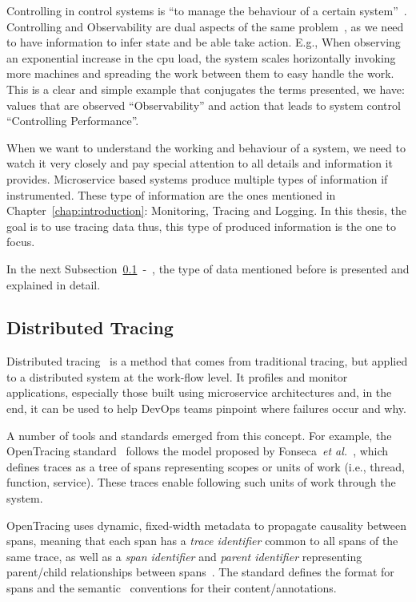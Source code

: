 Controlling in control systems is ``to manage the behaviour of a certain system''~\cite{control_systems}. Controlling and Observability are dual aspects of the same problem~\cite{observability}, as we need to have information to infer state and be able take action. E.g., When observing an exponential increase in the \gls{cpu} load, the system scales horizontally invoking more machines and spreading the work between them to easy handle the work. This is a clear and simple example that conjugates the terms presented, we have: values that are observed ``Observability'' and action that leads to system control ``Controlling Performance''.

When we want to understand the working and behaviour of a system, we need to watch it very closely and pay special attention to all details and information it provides. Microservice based systems produce multiple types of information if instrumented. These type of information are the ones mentioned in Chapter~\ref{chap:introduction}: Monitoring, Tracing and Logging. In this thesis, the goal is to use tracing data thus, this type of produced information is the one to focus.

In the next Subsection~\ref{subsec:distributed_tracing}~-~, the type of data mentioned before is presented and explained in detail.

\subsection{Distributed Tracing}
\label{subsec:distributed_tracing}


Distributed tracing~\cite{Sambasivan2016} is a method that comes from traditional tracing, but applied to a distributed system at the work-flow level. It profiles and monitor applications, especially those built using microservice architectures and, in the end, it can be used to help DevOps teams pinpoint where failures occur and why.

A number of tools and standards emerged from this concept. For example, the OpenTracing standard~\cite{open_tracing_data_model_specification} follows the model proposed by Fonseca~\textit{et al.}~\cite{fonseca2007x}, which defines traces as a tree of spans representing scopes or units of work (i.e., thread, function, service). These traces enable following such units of work through the system.

OpenTracing uses dynamic, fixed-width metadata to propagate causality between spans, meaning that each span has a \emph{trace identifier} common to all spans of the same trace, as well as a \emph{span identifier} and \emph{parent identifier} representing parent/child relationships between spans~\cite{Sambasivan2014}. The standard defines the format for spans and the semantic~\cite{open_tracing_semantic_specification, open_tracing_semantic_conventions} conventions for their content/annotations.

